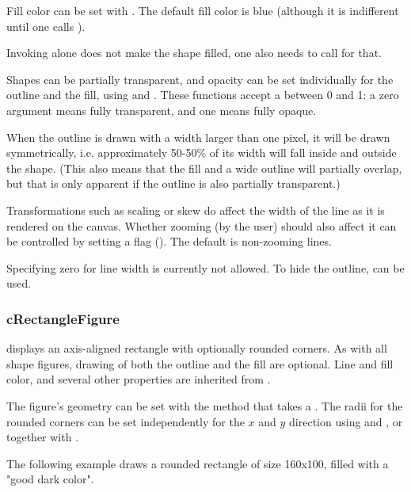 Fill color can be set with . The default fill color
is blue (although it is indifferent until one calls ).

\begin{note}
Invoking  alone does not make the shape filled,
one also needs to call  for that.
\end{note}

Shapes can be partially transparent, and opacity can be set individually
for the outline and the fill, using  and
. These functions accept a  between 0
and 1: a zero argument means fully transparent, and one means fully opaque.

When the outline is drawn with a width larger than one pixel, it will be
drawn symmetrically, i.e. approximately 50-50\% of its width will fall
inside and outside the shape. (This also means that the fill and a wide
outline will partially overlap, but that is only apparent if the
outline is also partially transparent.)

Transformations such as scaling or skew do affect the width of the line as it
is rendered on the canvas. Whether zooming (by the user) should also affect
it can be controlled by setting a flag ().
The default is non-zooming lines.

Specifying zero for line width is currently not allowed. To hide the outline,
 can be used.


\subsubsection{cRectangleFigure}
\label{sec:graphics:rectanglefigure}

 displays an axis-aligned rectangle with
optionally rounded corners. As with all shape figures, drawing of both the
outline and the fill are optional. Line and fill color, and several other
properties are inherited from .

The figure's geometry can be set with the  method that
takes a . The radii for the rounded corners can
be set independently for the $x$ and $y$ direction using
 and , or together with
.

The following example draws a rounded rectangle of size 160x100, filled with
a "good dark color".


